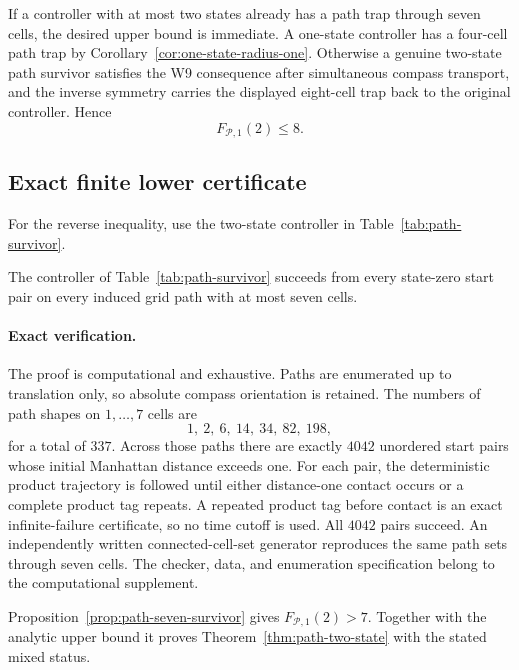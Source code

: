 

If a controller with at most two states already has a path trap through seven cells, the desired upper bound is immediate.  A one-state controller has a four-cell path trap by Corollary~\ref{cor:one-state-radius-one}.  Otherwise a genuine two-state path survivor satisfies the W9 consequence after simultaneous compass transport, and the inverse symmetry carries the displayed eight-cell trap back to the original controller.  Hence
\[
 F_{\mathcal P,1}(2)\le8.
\]

\subsection{Exact finite lower certificate}

For the reverse inequality, use the two-state controller in Table~\ref{tab:path-survivor}.



\begin{proposition}\label{prop:path-seven-survivor}
The controller of Table~\ref{tab:path-survivor} succeeds from every state-zero start pair on every induced grid path with at most seven cells.
\end{proposition}

\paragraph{Exact verification.}
The proof is computational and exhaustive.  Paths are enumerated up to translation only, so absolute compass orientation is retained.  The numbers of path shapes on $1,\ldots,7$ cells are
\[
 1,\ 2,\ 6,\ 14,\ 34,\ 82,\ 198,
\]
for a total of $337$.  Across those paths there are exactly $4042$ unordered start pairs whose initial Manhattan distance exceeds one.  For each pair, the deterministic product trajectory is followed until either distance-one contact occurs or a complete product tag repeats.  A repeated product tag before contact is an exact infinite-failure certificate, so no time cutoff is used.  All $4042$ pairs succeed.  An independently written connected-cell-set generator reproduces the same path sets through seven cells.  The checker, data, and enumeration specification belong to the computational supplement.

Proposition~\ref{prop:path-seven-survivor} gives $F_{\mathcal P,1}(2)>7$.  Together with the analytic upper bound it proves Theorem~\ref{thm:path-two-state} with the stated mixed status.

